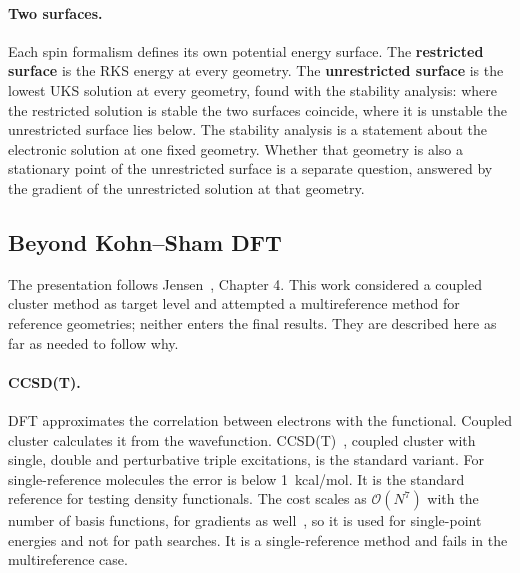 \paragraph{Two surfaces.} Each spin formalism defines its own potential
energy surface. The \textbf{restricted surface} is the RKS energy at
every geometry. The \textbf{unrestricted surface} is the lowest UKS
solution at every geometry, found with the stability analysis: where
the restricted solution is stable the two surfaces coincide, where it
is unstable the unrestricted surface lies below. The stability analysis
is a statement about the electronic solution at one fixed geometry.
Whether that geometry is also a stationary point of the unrestricted
surface is a separate question, answered by the gradient of the
unrestricted solution at that geometry.

\subsection{Beyond Kohn--Sham DFT}
\label{sec:background-beyond}

The presentation follows Jensen~\cite{jensen2017}, Chapter 4. This work
considered a coupled cluster method as target level and attempted a
multireference method for reference geometries; neither enters the
final results. They are described here as far as
needed to follow why.

\paragraph{CCSD(T).} DFT approximates the correlation between electrons
with the functional. Coupled cluster calculates it from the wavefunction.
\mbox{CCSD(T)}~\cite{raghavachari1989}, coupled cluster with single,
double and perturbative triple excitations, is the standard variant. For
single-reference molecules the error is below 1~kcal/mol. It is the
standard reference for testing density functionals. The cost scales as
$\mathcal{O}(N^7)$ with the number of basis functions, for gradients as
well~\cite{scuseria1991}, so it is used for single-point energies and not
for path searches. It is a single-reference method and fails in the
multireference case.


